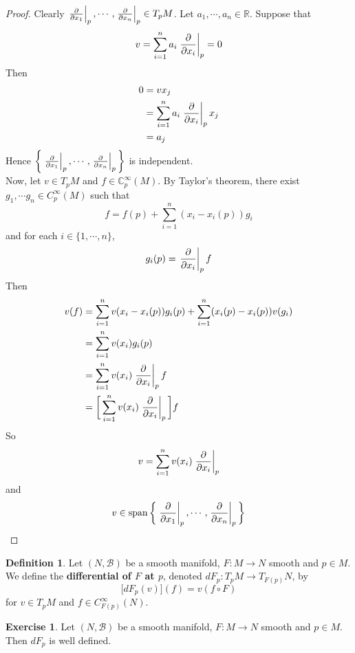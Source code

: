 \documentclass[12pt]{amsart}
\theoremstyle{definition}
\newtheorem{defn}[definition]{Definition}
\theoremstyle{remark}
\theoremstyle{definition}
\newtheorem{ex}[definition]{Exercise}
\newcommand{\C}{\mathbb{C}}
\newcommand{\R}{\mathbb{R}}
\newcommand{\MB}{\mathcal{B}}
\DeclareMathOperator{\spn}{span}
\begin{document}
	\begin{proof}
		Clearly $\eval{\pdv{x_1}}_{p}, \cdots, \eval{\pdv{x_n}}_{p} \in T_pM$. Let $a_1, \cdots, a_n \in \R$. Suppose that $$v = \sum_{i=1}^n a_i \eval{\pdv{x_i}}_{p} = 0$$
		Then 
		\begin{align*}
			0
			&= v x_j \\
			&= \sum_{i=1}^n a_i \eval{\pdv{x_i}}_{p} x_j \\
			&= a_j
		\end{align*}
		Hence $\bigg \{\eval{\pdv{x_1}}_{p}, \cdots, \eval{\pdv{x_n}}_{p} \bigg \}$ is independent.\\
		Now, let $v \in T_pM$ and $f \in \C^{\infty}_p(M)$. By Taylor's theorem, there exist $g_1, \cdots g_n \in C_p^{\infty}(M)$ such that $$f = f(p) + \sum_{i=1}^n(x_i - x_i(p)) g_i$$ and for each $i \in \{1, \cdots, n\}$, $$g_i(p) = \eval{\pdv{x_i}}_{p} f $$ Then 
		\begin{align*}
			v(f)
			&= \sum_{i=1}^nv(x_i - x_i(p)) g_i(p) + \sum_{i=1}^n(x_i(p) - x_i(p)) v(g_i) \\
			&= \sum_{i=1}^nv(x_i)g_i(p) \\
			&= \sum_{i=1}^nv(x_i)\eval{\pdv{x_i}}_{p} f \\
			&= \bigg[ \sum_{i=1}^nv(x_i)\eval{\pdv{x_i}}_{p} \bigg] f
		\end{align*}
		So $$v = \sum_{i=1}^nv(x_i)\eval{\pdv{x_i}}_{p} $$ and $$v \in \spn \bigg \{\eval{\pdv{x_1}}_{p}, \cdots, \eval{\pdv{x_n}}_{p} \bigg \}$$
	\end{proof}



	\begin{defn}
		Let $(N, \MB)$ be a smooth manifold, $F: M \rightarrow N$ smooth and $p \in M$. We define the \textbf{differential of $F$ at $p$}, denoted $dF_p: T_pM \rightarrow T_{F(p)}N$, by $$\bigg[ dF_p(v) \bigg] (f) = v (f \circ F)$$  for $v \in T_pM$ and $f \in C^{\infty}_{F(p)}(N)$.
	\end{defn}
	
	
	
	\begin{ex}
	Let $(N, \MB)$ be a smooth manifold, $F: M \rightarrow N$ smooth and $p \in M$. Then $dF_p$ is well defined.
	\end{ex}
	
\end{document}
